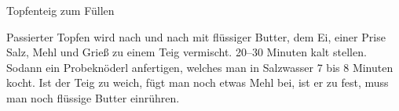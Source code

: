 \begin{recipe}{Topfenteig zum Füllen}%

    \begin{ingredients}
    \end{ingredients}

    \begin{instructions}
        Passierter Topfen wird nach und nach mit flüssiger Butter, dem Ei, einer Prise Salz, Mehl und Grieß zu einem Teig vermischt.
        20--30 Minuten kalt stellen.
        Sodann ein Probeknöderl anfertigen, welches man in Salzwasser 7 bis 8 Minuten kocht.
        Ist der Teig zu weich, fügt man noch etwas Mehl bei, ist er zu fest, muss man noch flüssige Butter einrühren.
    \end{instructions}
\end{recipe}
